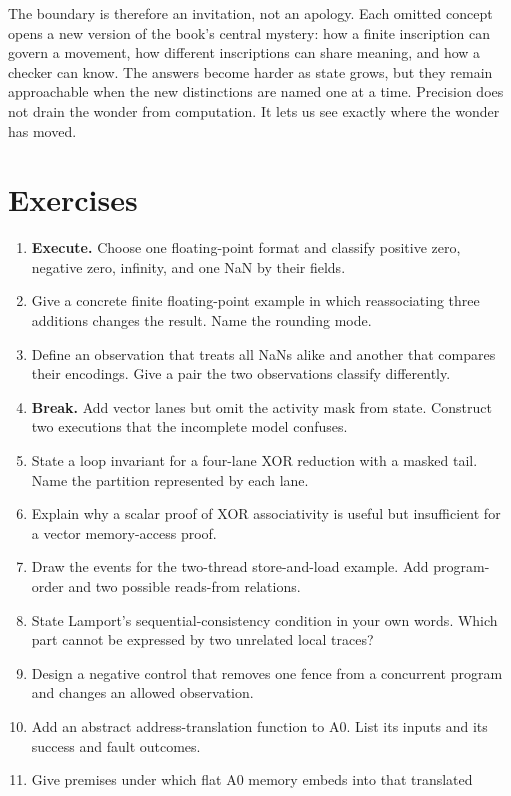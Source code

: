 The boundary is therefore an invitation, not an apology. Each omitted concept
opens a new version of the book's central mystery: how a finite inscription can
govern a movement, how different inscriptions can share meaning, and how a
checker can know. The answers become harder as state grows, but they remain
approachable when the new distinctions are named one at a time. Precision does
not drain the wonder from computation. It lets us see exactly where the wonder
has moved.

\section{Exercises}

\begin{enumerate}
\item \textbf{Execute.} Choose one floating-point format and classify positive
zero, negative zero, infinity, and one NaN by their fields.
\item Give a concrete finite floating-point example in which reassociating
three additions changes the result. Name the rounding mode.
\item Define an observation that treats all NaNs alike and another that compares
their encodings. Give a pair the two observations classify differently.
\item \textbf{Break.} Add vector lanes but omit the activity mask from state.
Construct two executions that the incomplete model confuses.
\item State a loop invariant for a four-lane XOR reduction with a masked tail.
Name the partition represented by each lane.
\item Explain why a scalar proof of XOR associativity is useful but insufficient
for a vector memory-access proof.
\item Draw the events for the two-thread store-and-load example. Add program-
order and two possible reads-from relations.
\item State Lamport's sequential-consistency condition in your own words. Which
part cannot be expressed by two unrelated local traces?
\item Design a negative control that removes one fence from a concurrent
program and changes an allowed observation.
\item Add an abstract address-translation function to A0. List its inputs and
its success and fault outcomes.
\item Give premises under which flat A0 memory embeds into that translated

\end{enumerate}
